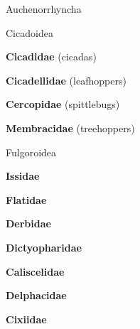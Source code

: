 \documentclass[letterpaper,10pt]{article}
\begin{document}
{\makebox[0.20cm]{}  Auchenorrhyncha \par
\makebox[0.40cm]{}  Cicadoidea \par
\makebox[0.6cm]{}  \textbf{Cicadidae} (cicadas) \par
\makebox[0.6cm]{}  \textbf{Cicadellidae} (leafhoppers) \par
\makebox[0.6cm]{}  \textbf{Cercopidae} (spittlebugs) \par
\makebox[0.6cm]{}  \textbf{Membracidae} (treehoppers) \par
\makebox[0.40cm]{}  Fulgoroidea \par
\makebox[0.6cm]{}  \textbf{Issidae} \par
\makebox[0.6cm]{}  \textbf{Flatidae} \par
\makebox[0.6cm]{}  \textbf{Derbidae} \par
\makebox[0.6cm]{}  \textbf{Dictyopharidae} \par
\makebox[0.6cm]{}  \textbf{Caliscelidae} \par
\makebox[0.6cm]{}  \textbf{Delphacidae} \par
\makebox[0.6cm]{}  \textbf{Cixiidae} \par

}
\end{document}
